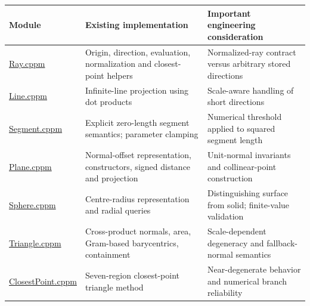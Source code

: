 {\def\LTcaptype{none} %
\begin{longtable}[]{@{}
  >{\raggedright\arraybackslash}p{}
  >{\raggedright\arraybackslash}p{}
  >{\raggedright\arraybackslash}p{}@{}}
\toprule\noalign{}
\begin{minipage}[b]{\linewidth}\raggedright
Module
\end{minipage} & \begin{minipage}[b]{\linewidth}\raggedright
Existing implementation
\end{minipage} & \begin{minipage}[b]{\linewidth}\raggedright
Important engineering consideration
\end{minipage} \\
\midrule\noalign{}
\endhead
\bottomrule\noalign{}
\endlastfoot
\href{https://github.com/swayam8624/KairoGeometry/blob/master/Ray.cppm?utm_source=chatgpt.com}{Ray.cppm} & Origin, direction, evaluation, normalization and closest-point helpers & Normalized-ray contract versus arbitrary stored directions \\
\href{https://github.com/swayam8624/KairoGeometry/blob/master/Line.cppm?utm_source=chatgpt.com}{Line.cppm} & Infinite-line projection using dot products & Scale-aware handling of short directions \\
\href{https://github.com/swayam8624/KairoGeometry/blob/master/Segment.cppm?utm_source=chatgpt.com}{Segment.cppm} & Explicit zero-length segment semantics; parameter clamping & Numerical threshold applied to squared segment length \\
\href{https://github.com/swayam8624/KairoGeometry/blob/master/Plane.cppm?utm_source=chatgpt.com}{Plane.cppm} & Normal-offset representation, constructors, signed distance and projection & Unit-normal invariants and collinear-point construction \\
\href{https://github.com/swayam8624/KairoGeometry/blob/master/Sphere.cppm?utm_source=chatgpt.com}{Sphere.cppm} & Centre-radius representation and radial queries & Distinguishing surface from solid; finite-value validation \\
\href{https://github.com/swayam8624/KairoGeometry/blob/master/Triangle.cppm?utm_source=chatgpt.com}{Triangle.cppm} & Cross-product normals, area, Gram-based barycentrics, containment & Scale-dependent degeneracy and fallback-normal semantics \\
\href{https://github.com/swayam8624/KairoGeometry/blob/master/ClosestPoint.cppm?utm_source=chatgpt.com}{ClosestPoint.cppm} & Seven-region closest-point triangle method & Near-degenerate behavior and numerical branch reliability \\
\end{longtable}
}

